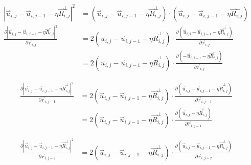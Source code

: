 \documentclass{article}
\renewcommand{\ij}{_{i,j}}
\newcommand{\ijj}{_{i,j-1}}
\newcommand{\ijjj}{_{i,j-2}}
\newcommand{\magn}[1]{\left\vert #1 \right\vert }
\renewcommand{\part}[2]{\frac{\partial #1 }{\partial #2}}
\newcommand{\harp}{\overset{\rightharpoonup}}
\newcommand{\rij}{\harp r \ij}
\newcommand{\Rij}{\harp R \ij}
\newcommand{\rijj}{\harp r \ijj}
\newcommand{\rijjj}{\harp r \ijjj}
\newcommand{\uij}{\harp u \ij}
\newcommand{\uijj}{\harp u \ijj}
\begin{document}
\begin{align*}
  \magn{\uij - \uijj - \eta \Rij^\perp}^2 
  &=
  \left(\uij - \uijj - \eta \Rij^\perp\right)
  \cdot 
  \left(\uij - \uijj - \eta \Rij^\perp\right)
  \\
  \part{\magn{\uij - \uijj - \eta \Rij^\perp}^2 }{
    \rij 
  }
  &=
  2\left(\uij - \uijj - \eta \Rij^\perp\right) \cdot
  \part{\left(\uij - \uijj - \eta \Rij^\perp\right)}{\rij}
  \\
  &=
  2\left(\uij - \uijj - \eta \Rij^\perp\right) \cdot
  \part{\left(- \uijj - \eta \Rij^\perp\right)}{\rij}
\end{align*}


\begin{align*}
  \part{\magn{\uij - \uijj - \eta \Rij^\perp}^2 }{
    \rijj
  }
  &=
  2\left(\uij - \uijj - \eta \Rij^\perp\right) \cdot
  \part{\left(\uij - \uijj - \eta \Rij^\perp\right)}{\rijj}
  \\
  &=
  2\left(\uij - \uijj - \eta \Rij^\perp\right) \cdot
  \part{\left(\uij - \eta \Rij^\perp\right)}{\rijj}
\end{align*}


\begin{align*}
  \part{\magn{\uij - \uijj - \eta \Rij^\perp}^2 }{
    \rijjj
  }
  &=
  2\left(\uij - \uijj - \eta \Rij^\perp\right) \cdot
  \part{\left(\uij - \uijj - \eta \Rij^\perp\right)}{\rijjj}
\end{align*}
\end{document}
